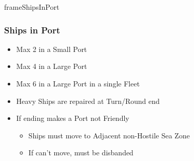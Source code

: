 \documentclass[10pt]{article}
\newlength{\fhShipsInPort} \setlength\fhShipsInPort{10\baselineskip}
\begin{document}
\begin{dynamiccontents*}{frameShipsInPort}\begin{eubox}{\fhShipsInPort}
	\subsubsection*{Ships in Port }
	\begin{itemize}
		\item Max 2 in a Small Port
		\item Max 4 in a Large Port
		\item Max 6 in a Large Port in a single Fleet
		\item Heavy Ships are repaired at Turn/Round end
		\item If ending \alliance makes a Port not Friendly
		\begin{itemize}
			\item Ships must move to Adjacent non-Hostile Sea Zone
			\item If can't move, must be disbanded 
		\end{itemize}
	\end{itemize}
\end{eubox}\end{dynamiccontents*}
\end{document}
